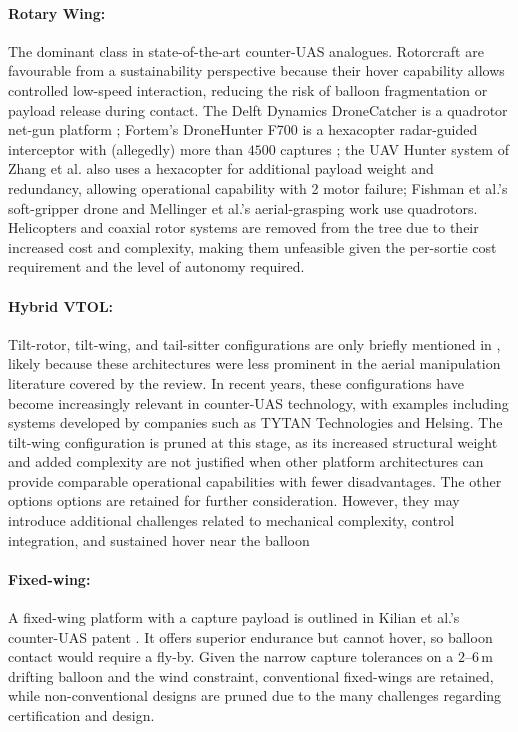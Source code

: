 \paragraph{Rotary Wing:} The dominant class in state-of-the-art counter-UAS analogues. Rotorcraft are favourable from a sustainability perspective because their hover capability allows controlled low-speed interaction, reducing the risk of balloon fragmentation or payload release during contact. The Delft Dynamics DroneCatcher is a quadrotor net-gun platform \cite{DroneCatcher}; Fortem's DroneHunter F700 is a hexacopter radar-guided interceptor with (allegedly) more than $4500$ captures \cite{Fortem}; the UAV Hunter system of Zhang et al. \cite{Zhang2024UAVDefense} also uses a hexacopter for additional payload weight and redundancy, allowing operational capability with 2 motor failure; Fishman et al.'s soft-gripper drone \cite{Fishman2021DynamicPractice} and Mellinger et al.'s aerial-grasping work \cite{Mellinger20112011Systems} use quadrotors. Helicopters and coaxial rotor systems are removed from the tree due to their increased cost and complexity, making them unfeasible given the per-sortie cost requirement and the level of autonomy required.
\vspace{-10pt}
\paragraph{Hybrid VTOL:} Tilt-rotor, tilt-wing, and tail-sitter configurations are only briefly mentioned in \cite{Ruggiero2018AerialReview}, likely because these architectures were less prominent in the aerial manipulation literature covered by the review. In recent years, these configurations have become increasingly relevant in counter-UAS technology, with examples including systems developed by companies such as TYTAN Technologies and Helsing. The tilt-wing configuration is pruned at this stage, as its increased structural weight and added complexity are not justified when other platform architectures can provide comparable operational capabilities with fewer disadvantages. The other options options are retained for further consideration. However, they may introduce additional challenges related to mechanical complexity, control integration, and sustained hover near the balloon
\vspace{-10pt}
\paragraph{Fixed-wing:} A fixed-wing platform with a capture payload is outlined in Kilian et al.'s counter-UAS patent \cite{Kilian2018UnmannedUAVs}. It offers superior endurance but cannot hover, so balloon contact would require a fly-by. Given the narrow capture tolerances on a $2$--$6\,\mathrm{m}$ drifting balloon and the wind constraint, conventional fixed-wings are retained, while non-conventional designs are pruned due to the many challenges regarding certification and design.
\vspace{-10pt}

